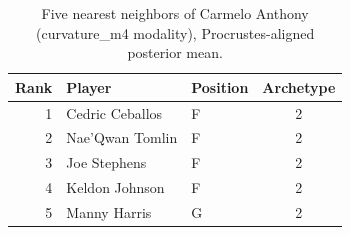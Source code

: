 \begin{table}[htbp]
  \centering\small
  \begin{tabular}{rllc}
    \toprule
    Rank & Player & Position & Archetype \\
    \midrule
    1 & Cedric Ceballos & F & 2 \\
    2 & Nae'Qwan Tomlin & F & 2 \\
    3 & Joe Stephens & F & 2 \\
    4 & Keldon Johnson & F & 2 \\
    5 & Manny Harris & G & 2 \\
    \bottomrule
  \end{tabular}
  \caption{Five nearest neighbors of Carmelo Anthony (curvature_m4 modality), Procrustes-aligned posterior mean.}
  \label{tab:Carmelo_Anthony_neighbors_curvature_m4}
\end{table}

